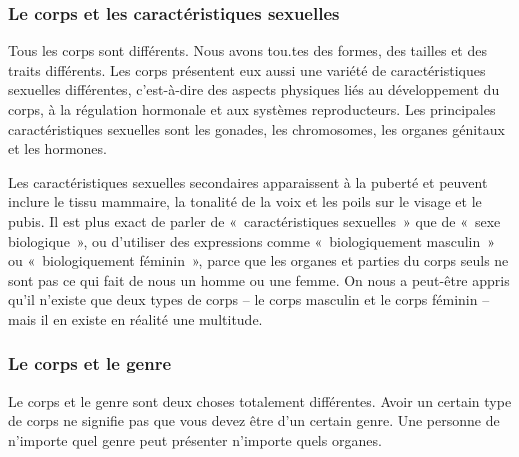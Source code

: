 \documentclass[12pt,openany]{book}
\begin{document}
\subsubsection*{Le corps et les caractéristiques sexuelles}

\noindent Tous les corps sont différents. Nous avons tou.tes des formes, des tailles et des traits différents. Les corps présentent eux aussi une variété de caractéristiques sexuelles différentes, c’est-à-dire des aspects physiques liés au développement du corps, à la régulation hormonale et aux systèmes reproducteurs. Les principales caractéristiques sexuelles sont les gonades, les chromosomes, les organes génitaux et les hormones.

Les caractéristiques sexuelles secondaires apparaissent à la puberté et peuvent inclure le tissu mammaire, la tonalité de la voix et les poils sur le visage et le pubis. Il est plus exact de parler de \mbox{« c}aractéristiques sexuelle\mbox{s »} que de \mbox{« s}exe biologiqu\mbox{e »}, ou d’utiliser des expressions comme \mbox{« b}iologiquement masculi\mbox{n »} ou \mbox{« b}iologiquement fémini\mbox{n »}, parce que les organes et parties du corps seuls ne sont pas ce qui fait de nous un homme ou une femme. On nous a peut-être appris qu’il n’existe que deux types de corps – le corps masculin et le corps féminin – mais il en existe en réalité une multitude.

\begin{figure}[h]
    \centering
\end{figure}

\subsubsection*{Le corps et le genre}

\noindent Le corps et le genre sont deux choses totalement différentes. Avoir un certain type de corps ne signifie pas que vous devez être d’un certain genre. Une personne de n’importe quel genre peut présenter n’importe quels organes.
\end{document}
